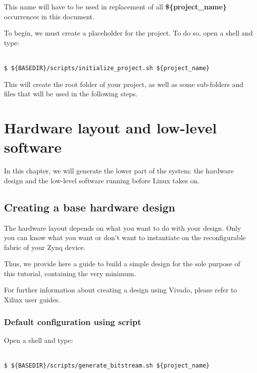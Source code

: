 \documentclass[openany,a4paper]{book}
\begin{document}
This name will have to be used in replacement of all \textbf{\$\{project\_name\}} occurrences in this document.

To begin, we must create a placeholder for the project.
To do so, open a shell and type:

\begin{tabbing}
\kill \hspace{1cm} \= \\
\> \texttt{\$ \$\{BASEDIR\}/scripts/initialize\_project.sh \$\{project\_name\}}\\
\end{tabbing}

This will create the root folder of your project, as well as some sub-folders and files that will be used in the following steps.



\chapter{Hardware layout and low-level software}

In this chapter, we will generate the lower part of the system: the hardware design and the low-level software running before Linux takes on.

\section{Creating a base hardware design}

The hardware layout depends on what you want to do with your design.
Only you can know what you want or don't want to instantiate on the reconfigurable fabric of your Zynq device.

Thus, we provide here a guide to build a simple design for the sole purpose of this tutorial, containing the very minimum.

For further information about creating a design using Vivado, please refer to Xilinx user guides.

\subsection{Default configuration using script}

Open a shell and type:
\begin{tabbing}
\kill \hspace{1cm} \= \\
\> \texttt{\$ \$\{BASEDIR\}/scripts/generate\_bitstream.sh \$\{project\_name\}}\\
\end{tabbing}
\end{document}

